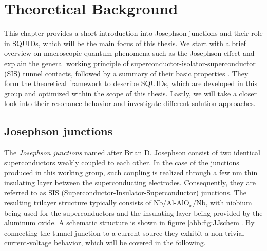 \chapter{Theoretical Background}

This chapter provides a short introduction into Josephson junctions and their role in SQUIDs, which will be the main focus of this thesis. We start with a brief overview on macroscopic quantum phenomena such as the Josephson effect and explain the general working principle of superconductor-isolator-superconductor (SIS) tunnel contacts, followed by a summary of their basic properties . They form the theoretical framework to describe SQUIDs, which are developed in this group and optimized within the scope of this thesis. Lastly, we will take a closer look into their resonance behavior and investigate different solution approaches. 

\section{Josephson junctions}

The \textit{Josephson junctions} named after Brian D. Josephson consist of two identical superconductors weakly coupled to each other. In the case of the junctions produced in this working group, such coupling is realized through a few nm thin insulating layer between the superconducting electrodes. Consequently, they are referred to as SIS (Superconductor-Insulator-Superconductor) junctions. The resulting trilayer structure typically consists of Nb/Al-Al$\mathrm{O}_x$/Nb, with niobium being used for the superconductors and the insulating layer being provided by the aluminum oxide. A schematic structure is shown in figure \ref{abb:fig:JJschem}. %
By connecting the tunnel junction to a current source they exhibit a non-trivial current-voltage behavior, which will be covered in the following. 


